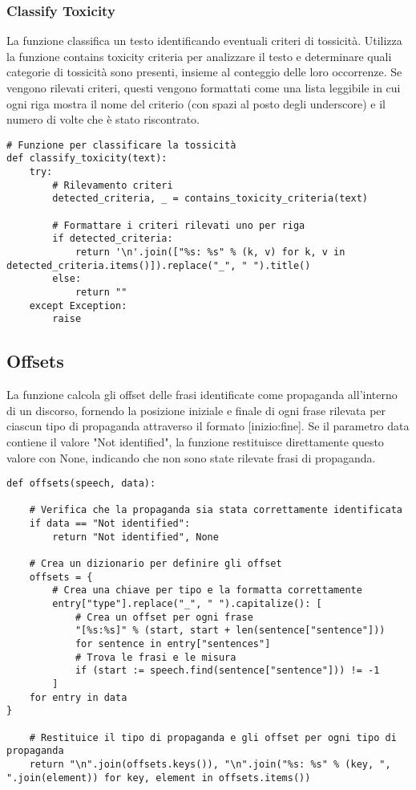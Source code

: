 \documentclass[12pt]{article}
\begin{document}
		\subsubsection{Classify Toxicity}
La funzione  classifica un testo identificando eventuali criteri di tossicità. Utilizza la funzione contains toxicity criteria per analizzare il testo e determinare quali categorie di tossicità sono presenti, insieme al conteggio delle loro occorrenze.
Se vengono rilevati criteri, questi vengono formattati come una lista leggibile in cui ogni riga mostra il nome del criterio (con spazi al posto degli underscore) e il numero di volte che è stato riscontrato.
	\begin{lstlisting}
# Funzione per classificare la tossicità
def classify_toxicity(text):
	try:
		# Rilevamento criteri
		detected_criteria, _ = contains_toxicity_criteria(text)

		# Formattare i criteri rilevati uno per riga
		if detected_criteria:
			return '\n'.join(["%s: %s" % (k, v) for k, v in detected_criteria.items()]).replace("_", " ").title()
		else:
			return ""
	except Exception:
		raise
	\end{lstlisting}
	
		\subsection{Offsets}	
La funzione calcola gli offset delle frasi identificate come propaganda all'interno di un discorso, fornendo la posizione iniziale e finale di ogni frase rilevata per ciascun tipo di propaganda attraverso il formato [inizio:fine].
Se il parametro data contiene il valore "Not identified", la funzione restituisce direttamente questo valore con None, indicando che non sono state rilevate frasi di propaganda.		
	\begin{lstlisting}
def offsets(speech, data):

	# Verifica che la propaganda sia stata correttamente identificata
	if data == "Not identified":
		return "Not identified", None

	# Crea un dizionario per definire gli offset
	offsets = {
		# Crea una chiave per tipo e la formatta correttamente 
		entry["type"].replace("_", " ").capitalize(): [
			# Crea un offset per ogni frase
			"[%s:%s]" % (start, start + len(sentence["sentence"]))
			for sentence in entry["sentences"]
			# Trova le frasi e le misura
			if (start := speech.find(sentence["sentence"])) != -1
		]
	for entry in data
}

	# Restituice il tipo di propaganda e gli offset per ogni tipo di propaganda
	return "\n".join(offsets.keys()), "\n".join("%s: %s" % (key, ", ".join(element)) for key, element in offsets.items())
	\end{lstlisting}
	
\end{document}
